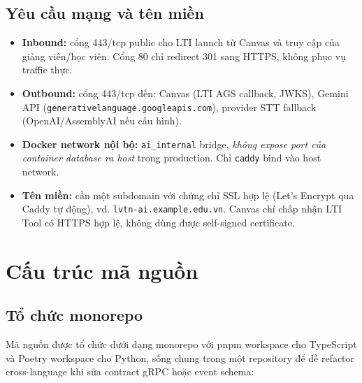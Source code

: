 \subsection{Yêu cầu mạng và tên miền}
\label{subsec:network-req}

\begin{itemize}
    \item \textbf{Inbound:} cổng 443/tcp public cho LTI launch từ
          Canvas và truy cập của giảng viên/học viên. Cổng 80 chỉ
          redirect 301 sang HTTPS, không phục vụ traffic thực.
    \item \textbf{Outbound:} cổng 443/tcp đến: Canvas (LTI AGS
          callback, JWKS), Gemini API
          (\texttt{generativelanguage.googleapis.com}), provider STT
          fallback (OpenAI/AssemblyAI nếu cấu hình).
    \item \textbf{Docker network nội bộ:} \texttt{ai\_internal} bridge,
          \textit{không expose port của container database ra host}
          trong production. Chỉ \texttt{caddy} bind vào host network.
    \item \textbf{Tên miền:} cần một subdomain với chứng chỉ SSL hợp
          lệ (Let's Encrypt qua Caddy tự động), vd.
          \texttt{lvtn-ai.example.edu.vn}. Canvas chỉ chấp nhận LTI
          Tool có HTTPS hợp lệ, không dùng được self-signed certificate.
\end{itemize}

\section{Cấu trúc mã nguồn}
\label{sec:code-structure}

\subsection{Tổ chức monorepo}

Mã nguồn được tổ chức dưới dạng monorepo với pnpm workspace cho
TypeScript và Poetry workspace cho Python, sống chung trong một
repository để dễ refactor cross-language khi sửa contract gRPC hoặc
event schema:

